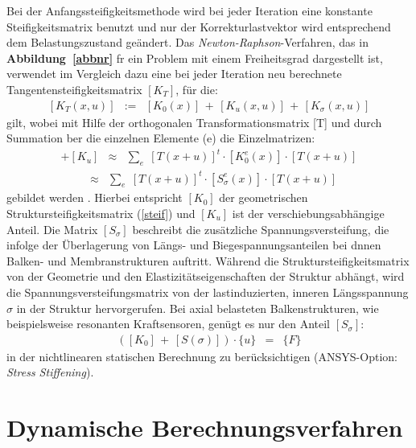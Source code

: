 Bei der Anfangssteifigkeitsmethode wird bei jeder
Iteration eine konstante Steifigkeitsmatrix benutzt und nur der
Korrekturlastvektor wird entsprechend dem Belastungszustand geändert.
Das {\sl Newton-Raphson}-Verfahren, das in {\bf Abbildung~\ref{abbnr}}
fr ein Problem mit einem Freiheitsgrad dargestellt ist, verwendet im
Vergleich dazu eine bei jeder Iteration neu berechnete
Tangentensteifigkeitsmatrix $[K_{T}]$, für die:
\begin{eqnarray}
\label{tangentenmatrix}
  [K_{T}(x,u)] & := &  [K_{0}(x)] \, + \, [K_{u}(x,u)] \, + \,
                       [K_{\sigma}(x,u)]
\end{eqnarray}
gilt, wobei mit Hilfe der orthogonalen Transformationsmatrix [T] und durch
Summation ber die einzelnen Elemente (e) die Einzelmatrizen:
\begin{eqnarray*}
 [K_{0}] + [K_{u}] & \approx &
   \sum_{e} \; [T(x+u)]^{t} \cdot [K_{0}^{e}(x)] \cdot [T(x+u)]
\end{eqnarray*}
\begin{eqnarray*}
 [K_{\sigma}] & \approx &
     \sum_{e} \; [T(x+u)]^{t} \cdot [S_{\sigma}^{e}(x)] \cdot [T(x+u)]
\end{eqnarray*}
gebildet werden \cite{Mat93}. Hierbei entspricht $[K_{0}]$
der geometrischen Struktursteifigkeitsmatrix (\ref{steif})
und $[K_{u}]$ ist der verschiebungsabhängige Anteil. Die Matrix
$[S_{\sigma}]$ beschreibt die zusätzliche Spannungsversteifung, die
infolge der Überlagerung von Längs- und
Biegespannungsanteilen bei dnnen Balken- und Membranstrukturen auftritt.
Während die Struktursteifigkeitsmatrix von der Geometrie und den
Elastizitätseigenschaften der Struktur abhängt, wird die
Spannungsversteifungsmatrix von der lastinduzierten, inneren Längsspannung
$\sigma$ in der Struktur hervorgerufen. Bei axial belasteten
Balkenstrukturen, wie beispielsweise resonanten Kraftsensoren,
genügt es nur den Anteil $[S_{\sigma}]$:
\begin{eqnarray}
\label{sstif}
 ([K_{0}] \, + \, [S(\sigma)]) \cdot \{u\} & = & \{F\}
\end{eqnarray}
in der nichtlinearen statischen Berechnung zu berücksichtigen
({\sf ANSYS}-Option: {\em Stress Stiffening}).



\section{Dynamische Berechnungsverfahren}
\label{dynamik}

